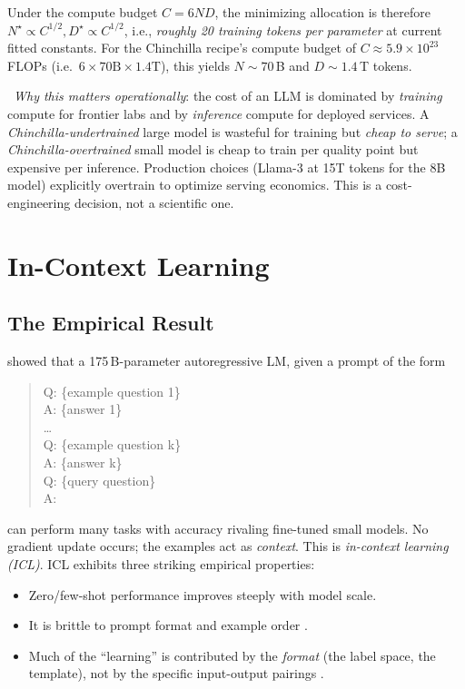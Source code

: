Under the compute budget $C = 6 N D$, the minimizing allocation is
therefore $N^\star \propto C^{1/2}, D^\star \propto C^{1/2}$, i.e.,
\emph{roughly 20 training tokens per parameter} at current fitted
constants. For the Chinchilla recipe's compute budget of
$C \approx 5.9 \times 10^{23}$ FLOPs (i.e.\ $6 \times 70\text{B}
\times 1.4\text{T}$), this yields $N \sim 70$\,B and $D \sim 1.4$\,T
tokens.

\Heur\ \emph{Why this matters operationally}: the cost of an LLM is
dominated by \emph{training} compute for frontier labs and by
\emph{inference} compute for deployed services. A
\emph{Chinchilla-undertrained} large model is wasteful for training
but \emph{cheap to serve}; a \emph{Chinchilla-overtrained} small
model is cheap to train per quality point but expensive per
inference. Production choices (Llama-3 at 15T tokens for the 8B
model) explicitly overtrain to optimize serving economics. This is a
cost-engineering decision, not a scientific one.

\section{In-Context Learning}

\subsection{The Empirical Result}

\citet{brown2020language} showed that a 175\,B-parameter
autoregressive LM, given a prompt of the form
\begin{quote}\small\ttfamily
Q: \{example question 1\}\\
A: \{answer 1\}\\
\ldots\\
Q: \{example question k\}\\
A: \{answer k\}\\
Q: \{query question\}\\
A:
\end{quote}
can perform many tasks with accuracy rivaling fine-tuned small models.
No gradient update occurs; the examples act as \emph{context}. This
is \emph{in-context learning (ICL)}. ICL exhibits three striking
empirical properties:
\begin{itemize}
  \item Zero/few-shot performance improves steeply with model scale.
  \item It is brittle to prompt format and example order
        \citep{lu2022fantastically}.
  \item Much of the ``learning'' is contributed by the \emph{format}
        (the label space, the template), not by the specific input-output
        pairings \citep{min2022rethinking}.
\end{itemize}

